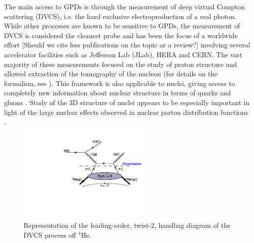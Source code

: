 \documentclass[preprint,nofootinbib,showpacs,prl,superscriptaddress,secnumarabic,amssymb,nobibnotes,aps,floatfix]{revtex4}
\begin{document}
The main access to GPDs is through the measurement of deep virtual Compton 
scattering (DVCS), i.e. the hard exclusive electroproduction of a real photon. 
While other processes are known to be sensitive to GPDs, the measurement of
DVCS is considered the cleanest probe and has been the focus of a worldwide effort 
\cite{Stepanyan:2001sm,Airapetian,Chekanov:2003ya,Aktas:2005ty,Chen:2006na,Munoz 
Camacho:2006hx,Girod:2007aa,Mazouz:2007aa,Gavalian:2009,Seder:2015,Pisano:2015,Jo:2015ema} 
[Should we cite less publications on the topic or a review?]
involving several accelerator facilities such as Jefferson Lab (JLab), HERA and  
CERN. The vast majority of these measurements focused on the study of 
proton structure and allowed extraction of the tomography of the nucleon (for details on the formalism, see 
\cite{Goeke:2001tz,Diehl:2003ny,Ji:2004gf,Belitsky:2005qn,Boffi:2007yc,Guidal:2013rya}).
This framework is also applicable to nuclei, giving access to completely new 
information about nuclear structure in terms of quarks and 
gluons \cite{Dupre:2015jha}.
Study of the 3D structure of nuclei appears to be especially important
in light of the large nuclear effects observed in nuclear parton distribution 
functions \cite{Geesaman:1995yd,Norton:2003cb,Hen:2016kwk}.

\begin{figure}[tb]
\includegraphics[width=6.5cm]{figs/DVCS_diagram.pdf}
\caption{Representation of the leading-order, twist-2, handbag diagram of the 
DVCS process off $^4$He.}
\label{fig:diags}
\end{figure}
\end{document}

